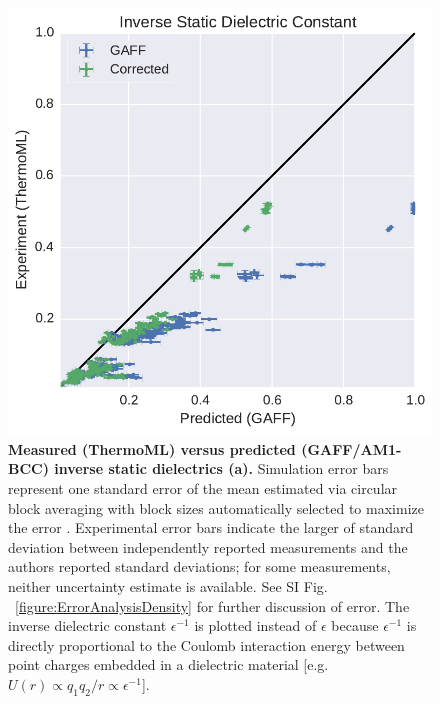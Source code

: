 \documentclass[aps,pre,twocolumn,nofootinbib,superscriptaddress,linenumbers]{revtex4-1}
\begin{document}

\begin{figure}
\includegraphics[width=\columnwidth]{./figures/dielectrics_thermoml.pdf}

\caption{{\bf Measured (ThermoML) versus predicted (GAFF/AM1-BCC) inverse static dielectrics (a).}
Simulation error bars represent one standard error of the mean estimated via circular block averaging \cite{sheppard_2015_15681} with block sizes automatically selected to maximize the error \cite{flyvbjerg1989error}.  
Experimental error bars indicate the larger of standard deviation between independently reported measurements and the authors reported standard deviations; for some measurements, neither uncertainty estimate is available.  
See SI Fig. ~\ref{figure:ErrorAnalysisDensity} for further discussion of error.  
The inverse dielectric constant $\epsilon^{-1}$ is plotted instead of $\epsilon$ because $\epsilon^{-1}$ is directly proportional to the Coulomb interaction energy between point charges embedded in a dielectric material [e.g. $U(r) \propto q_1 q_2 / r \propto \epsilon^{-1}$].
}
\label{figure:Dielectric}
\end{figure}
\end{document}
